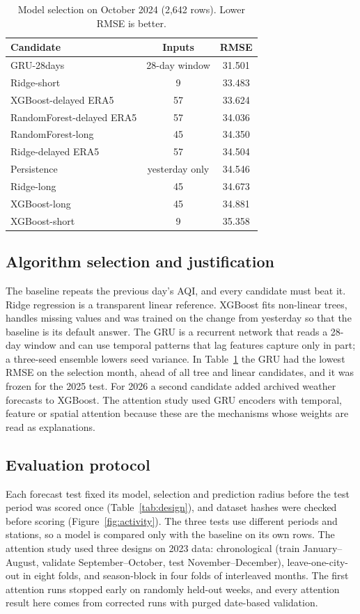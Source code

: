 \documentclass[pdflatex,sn-mathphys-num]{sn-jnl}
\begin{document}
\begin{table}[!htbp]
\centering
\small
\caption{Model selection on October 2024 (2,642 rows). Lower RMSE is better.}\label{tab:selection}
\begin{tabular}{lcc}
\toprule
\textbf{Candidate} & \textbf{Inputs} & \textbf{RMSE} \\
\midrule
GRU-28days & 28-day window & 31.501 \\
Ridge-short & 9 & 33.483 \\
XGBoost-delayed ERA5 & 57 & 33.624 \\
RandomForest-delayed ERA5 & 57 & 34.036 \\
RandomForest-long & 45 & 34.350 \\
Ridge-delayed ERA5 & 57 & 34.504 \\
Persistence & yesterday only & 34.546 \\
Ridge-long & 45 & 34.673 \\
XGBoost-long & 45 & 34.881 \\
XGBoost-short & 9 & 35.358 \\
\bottomrule
\end{tabular}
\end{table}

\subsection{Algorithm selection and justification}
The baseline repeats the previous day's AQI, and every candidate must beat it. Ridge regression is a transparent linear reference. XGBoost fits non-linear trees, handles missing values and was trained on the change from yesterday so that the baseline is its default answer. The GRU is a recurrent network that reads a 28-day window and can use temporal patterns that lag features capture only in part; a three-seed ensemble lowers seed variance. In Table~\ref{tab:selection} the GRU had the lowest RMSE on the selection month, ahead of all tree and linear candidates, and it was frozen for the 2025 test. For 2026 a second candidate added archived weather forecasts to XGBoost. The attention study used GRU encoders with temporal, feature or spatial attention because these are the mechanisms whose weights are read as explanations.

\subsection{Evaluation protocol}
Each forecast test fixed its model, selection and prediction radius before the test period was scored once (Table~\ref{tab:design}), and dataset hashes were checked before scoring (Figure~\ref{fig:activity}). The three tests use different periods and stations, so a model is compared only with the baseline on its own rows. The attention study used three designs on 2023 data: chronological (train January--August, validate September--October, test November--December), leave-one-city-out in eight folds, and season-block in four folds of interleaved months. The first attention runs stopped early on randomly held-out weeks, and every attention result here comes from corrected runs with purged date-based validation.
\end{document}
